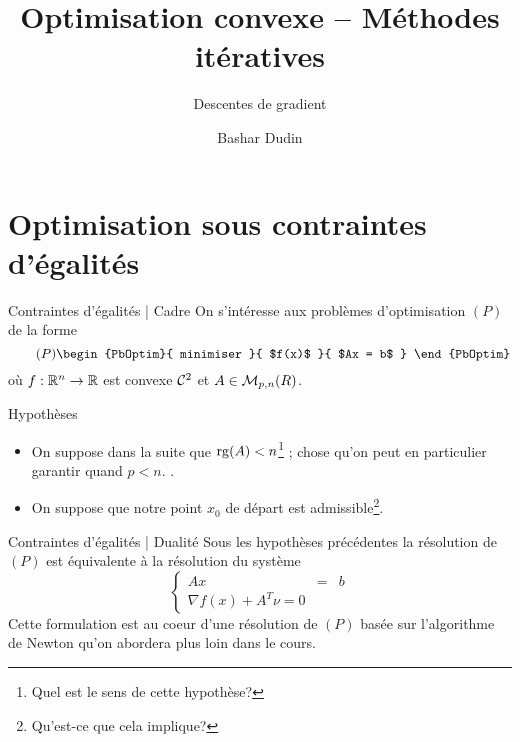 \documentclass[aspectratio = 169]{beamer}
\author[BD]{Bashar Dudin}
\institute[]{EPITA}
\title{Optimisation convexe -- Méthodes itératives} %
\subtitle{Descentes de gradient}
\begin{document}
\begin{frame}[plain]
\titlepage %
\end{frame}

\section{Optimisation sous contraintes d'égalités}

\begin{frame}{Contraintes d'égalités | Cadre}
  On s'intéresse aux problèmes d'optimisation $(P)$ de la forme
  \begin{equation}
    \label{P}
    \tag{$P$}
    \begin{PbOptim}{
        minimiser
      }{
        $f(x)$
      }{
        $Ax = b$
      }
    \end{PbOptim}
  \end{equation}
où $f :\mathbb{R}^n \to \mathbb{R}$ est convexe $\mathcal{C}^2$ et
  $A \in \mathcal{M}_{p, n}(R)$. \pause
  \begin{halfshyblock}{Hypothèses}
    \begin{itemize}
    \item<2-> On suppose dans la suite que $\operatorname{rg}(A) < n$\footnote{Quel
        est le sens de cette hypothèse?} ; chose qu'on peut en
      particulier garantir quand $ p < n$. .
    \item<2-> On suppose que notre point $x_0$ de départ est
      admissible\footnote{Qu'est-ce que cela implique?}.
    \end{itemize}
  \end{halfshyblock}
\end{frame}

\begin{frame}{Contraintes d'égalités | Dualité}
  Sous les hypothèses précédentes la résolution de $(P)$ est
  équivalente à la résolution du système
  \begin{equation}
    \label{KKT-P}
    \tag{KKT-$P$}
    \left\{
      \begin{array}{ccc}
        Ax & = & b \\
        \nabla f(x) + A^T\nu = 0
      \end{array}
    \right.
  \end{equation}
  Cette formulation est au coeur d'une résolution de $(P)$ basée sur
  l'algorithme de Newton qu'on abordera plus loin dans le cours.
\end{frame}
\end{document}
